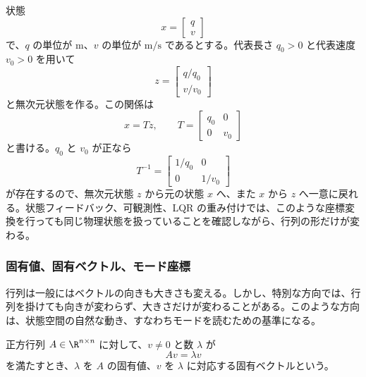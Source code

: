 \begin{example}[状態の単位をそろえる座標変換]
状態
\begin{equation}
  x=\begin{bmatrix}q\\v\end{bmatrix}
\end{equation}
で、$q$ の単位が m、$v$ の単位が $\mathrm{m/s}$ であるとする。代表長さ $q_0>0$ と代表速度 $v_0>0$ を用いて
\begin{equation}
  z=
  \begin{bmatrix}
    q/q_0\\
    v/v_0
  \end{bmatrix}
\end{equation}
と無次元状態を作る。この関係は
\begin{equation}
  x=Tz,\qquad
  T=
  \begin{bmatrix}
    q_0&0\\
    0&v_0
  \end{bmatrix}
\end{equation}
と書ける。$q_0$ と $v_0$ が正なら
\begin{equation}
  T^{-1}=
  \begin{bmatrix}
    1/q_0&0\\
    0&1/v_0
  \end{bmatrix}
\end{equation}
が存在するので、無次元状態 $z$ から元の状態 $x$ へ、また $x$ から $z$ へ一意に戻れる。状態フィードバック、可観測性、LQR の重み付けでは、このような座標変換を行っても同じ物理状態を扱っていることを確認しながら、行列の形だけが変わる。
\end{example}

\subsubsection{固有値、固有ベクトル、モード座標}

行列は一般にはベクトルの向きも大きさも変える。しかし、特別な方向では、行列を掛けても向きが変わらず、大きさだけが変わることがある。このような方向は、状態空間の自然な動き、すなわちモードを読むための基準になる。

\begin{definition}[固有値と固有ベクトル]
正方行列 $A\in\R^{n\times n}$ に対して、$v\ne0$ と数 $\lambda$ が
\begin{equation}
  Av=\lambda v
\end{equation}
を満たすとき、$\lambda$ を $A$ の固有値、$v$ を $\lambda$ に対応する固有ベクトルという。
\end{definition}

